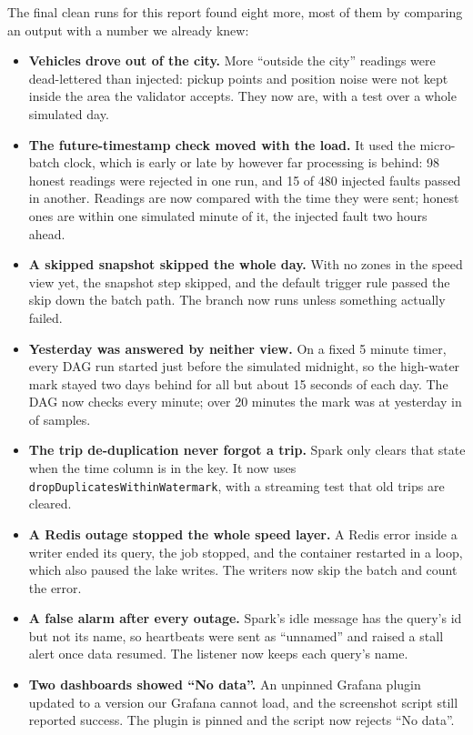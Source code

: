 \documentclass[11pt,a4paper]{article}
\begin{document}
The final clean runs for this report found eight more, most of them by comparing an
output with a number we already knew:

\begin{itemize}
  \item \textbf{Vehicles drove out of the city.} More ``outside the city'' readings were
  dead-lettered than injected: pickup points and position noise were not kept inside the
  area the validator accepts. They now are, with a test over a whole simulated day.
  \item \textbf{The future-timestamp check moved with the load.} It used the micro-batch
  clock, which is early or late by however far processing is behind: 98 honest readings
  were rejected in one run, and 15 of 480 injected faults passed in another. Readings are
  now compared with the time they were sent; honest ones are within one simulated
  minute of it, the injected fault two hours ahead.
  \item \textbf{A skipped snapshot skipped the whole day.} With no zones in the speed view
  yet, the snapshot step skipped, and the default trigger rule passed the skip down the
  batch path. The branch now runs unless something actually failed.
  \item \textbf{Yesterday was answered by neither view.} On a fixed 5 minute timer, every
  DAG run started just before the simulated midnight, so the high-water mark stayed two
  days behind for all but about 15 seconds of each day. The DAG now checks every minute;
  over 20 minutes the mark was at yesterday in \mHwmHealthy{} of samples.
  \item \textbf{The trip de-duplication never forgot a trip.} Spark only clears that state
  when the time column is in the key. It now uses \texttt{dropDuplicatesWithinWatermark},
  with a streaming test that old trips are cleared.
  \item \textbf{A Redis outage stopped the whole speed layer.} A Redis error inside a
  writer ended its query, the job stopped, and the container restarted in a loop, which
  also paused the lake writes. The writers now skip the batch and count the error.
  \item \textbf{A false alarm after every outage.} Spark's idle message has the query's
  id but not its name, so heartbeats were sent as ``unnamed'' and raised a stall alert
  once data resumed. The listener now keeps each query's name.
  \item \textbf{Two dashboards showed ``No data''.} An unpinned Grafana plugin updated
  to a version our Grafana cannot load, and the screenshot script still reported success.
  The plugin is pinned and the script now rejects ``No data''.
\end{itemize}
\end{document}
